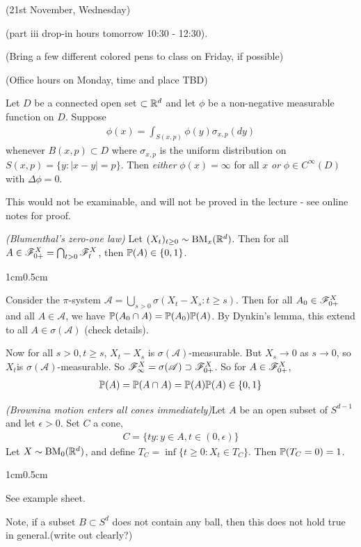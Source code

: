 \documentclass[12pt,a4paper]{report}
\newenvironment{proof}
{\begin{changemargin}{1cm}{0.5cm} 
	}%
	{\end{changemargin}
}
\begin{document}
\newday

(21st November, Wednesday)
\s

(part iii drop-in hours tomorrow 10:30 - 12:30).

(Bring a few different colored pens to class on Friday, if possible)

(Office hours on Monday, time and place TBD)
\s

 Let $D$ be a connected open set $\subset \mathbb{R}^d$ and let $\phi$ be a non-negative measurable function on $D$. Suppose
\begin{align*}
\phi(x) = \int_{S(x,p)} \phi(y) \sigma_{x,p}(dy)
\end{align*}
whenever $B(x,p) \subset D$ where $\sigma_{x,p}$ is the uniform distribution on $S(x,p) = \{ y : |x-y| =p \}$. Then \emph{either} $\phi(x) = \infty$ for all $x$ \emph{or} $\phi \in C^{\infty}(D)$ with $\Delta \phi =0$.
\s

This would not be examinable, and will not be proved in the lecture - see online notes for proof.
\s

 \emph{(Blumenthal's zero-one law)} Let $(X_t)_{t\geq 0} \sim \text{BM}_x(\mathbb{R}^d)$. Then for all $A\in \mathscr{F}_{0+}^{X} = \bigcap_{t>0} \mathscr{F}_{t}^X$, then $\mathbb{P}(A) \in \{ 0,1\}$.
\begin{proof}
\pf Consider the $\pi$-system $\mathscr{A} = \bigcup_{s>0} \sigma (X_t - X_s : t\geq s)$. Then for all $A_0 \in \mathscr{F}_{0+}^X$ and all $A \in \mathscr{A}$, we have $\mathbb{P}(A_0 \cap A) = \mathbb{P}(A_0) \mathbb{P}(A)$. By Dynkin's lemma, this extend to all $A\in \sigma(\mathscr{A})$ (check details).

Now for all $s>0, t\geq s$, $X_t - X_s$ is $\sigma(\mathscr{A})$-measurable. But $X_s \rightarrow 0$ as $s\rightarrow 0$, so $X_t $is $\sigma(\mathscr{A})$-measurable. So $\mathscr{F}_{\infty}^X = \sigma(\mathscr{A}) \supset \mathscr{F}_{0+}^X$. So for $A\in \mathscr{F}_{0+}^X$,
\begin{align*}
\mathbb{P}(A) = \mathbb{P}(A\cap A) = \mathbb{P}(A)\mathbb{P}(A) \in \{0,1\}
\end{align*}
\eop
\end{proof}
\s

 \emph{(Brownina motion enters all cones immediately)}Let $A$ be an open subset of $S^{d-1}$ and let $\epsilon>0$. Set $C$ a cone,
\begin{align*}
C = \{ty : y\in A, t\in (0,\epsilon) \}
\end{align*} 
Let $X \sim \text{BM}_0(\mathbb{R}^d)$, and define $T_C = \inf \{ t\geq 0: X_t \in T_C \}$. Then $\mathbb{P}(T_C =0)=1$. 
\begin{proof}
See example sheet.
\end{proof}
Note, if a subset $B \subset S^{d}$ does not contain any ball, then this does not hold true in general.(write out clearly?)
\s
\end{document}
